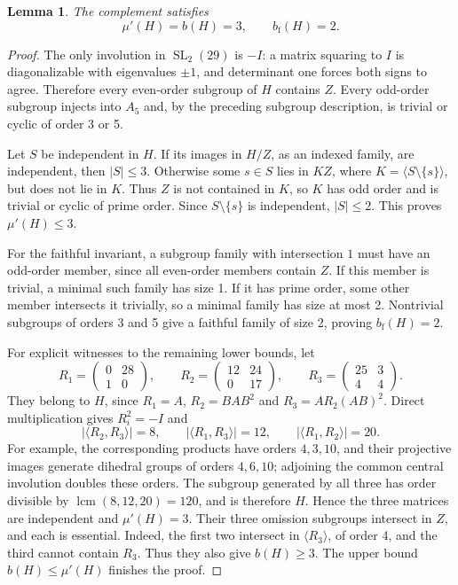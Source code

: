 \documentclass[11pt]{article}
\newtheorem{lemma}[theorem]{Lemma}
\theoremstyle{remark}\newtheorem{remark}[theorem]{Remark}
\newcommand{\mup}{\mu'}
\newcommand{\bfth}{b_{\mathrm f}}
\newcommand{\SL}{\operatorname{SL}}
\begin{document}
\begin{lemma}\label{lem:H}
The complement satisfies
\[
        \mup(H)=b(H)=3,\qquad \bfth(H)=2.
\]
\end{lemma}
\begin{proof}
The only involution in $\SL_2(29)$ is $-I$: a matrix squaring to $I$ is
diagonalizable with eigenvalues $\pm1$, and determinant one forces both
signs to agree. Therefore every even-order subgroup of $H$ contains $Z$.
Every odd-order subgroup injects into $A_5$ and, by the preceding subgroup
description, is trivial or cyclic of order 3 or 5.

Let $S$ be independent in $H$. If its images in $H/Z$, as an indexed family,
are independent, then $|S|\le3$. Otherwise some $s\in S$ lies in $KZ$, where
$K=\langle S\setminus\{s\}\rangle$, but does not lie in $K$. Thus $Z$ is not
contained in $K$, so $K$ has odd order and is trivial or cyclic of prime
order. Since $S\setminus\{s\}$ is independent, $|S|\le2$. This proves
$\mup(H)\le3$.

For the faithful invariant, a subgroup family with intersection $1$ must
have an odd-order member, since all even-order members contain $Z$. If this
member is trivial, a minimal such family has size 1. If it has prime order,
some other member intersects it trivially, so a minimal family has size at
most 2. Nontrivial subgroups of orders 3 and 5 give a faithful family of size
2, proving $\bfth(H)=2$.

For explicit witnesses to the remaining lower bounds, let
\begin{equation}\label{eq:R}
 R_1=\begin{pmatrix}0&28\\1&0\end{pmatrix},\qquad
 R_2=\begin{pmatrix}12&24\\0&17\end{pmatrix},\qquad
 R_3=\begin{pmatrix}25&3\\4&4\end{pmatrix}.
\end{equation}
They belong to $H$, since $R_1=A$, $R_2=BAB^2$ and
$R_3=AR_2(AB)^2$. Direct multiplication gives $R_i^2=-I$ and
\[
 |\langle R_2,R_3\rangle|=8,\qquad
 |\langle R_1,R_3\rangle|=12,\qquad
 |\langle R_1,R_2\rangle|=20.
\]
For example, the corresponding products have orders $4,3,10$, and their
projective images generate dihedral groups of orders $4,6,10$; adjoining the
common central involution doubles these orders. The subgroup generated by
all three has order divisible by $\operatorname{lcm}(8,12,20)=120$, and is
therefore $H$. Hence the three matrices are independent and $\mup(H)=3$.
Their three omission subgroups intersect in $Z$, and each is essential.
Indeed, the first two intersect in $\langle R_3\rangle$, of order 4, and the
third cannot contain $R_3$. Thus they also give $b(H)\ge3$. The upper bound
$b(H)\le\mup(H)$ finishes the proof.
\end{proof}
\end{document}
